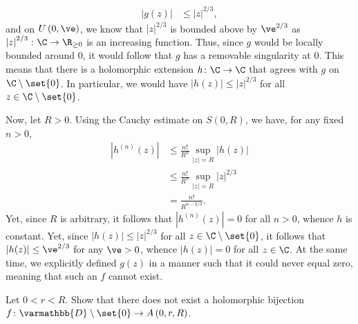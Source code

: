 \documentclass[10pt]{mypackage}
\renewcommand*{\mathbb}[1]{\varmathbb{#1}}
\begin{document}
\begin{solution}
\begin{enumerate}[(a)]
      \begin{align*}
        \left\vert g(z) \right\vert &\leq \left\vert z \right\vert^{2/3},
      \end{align*}
      and on $U\left( 0,\ve \right)$, we know that $\left\vert z \right\vert^{2/3}$ is bounded above by $\ve^{2/3}$ as $\left\vert z \right\vert^{2/3}\colon \C\rightarrow \R_{\geq 0}$ is an increasing function. Thus, since $g$ would be locally bounded around $0$, it would follow that $g$ has a removable singularity at $0$. This means that there is a holomorphic extension $h\colon \C\rightarrow \C$ that agrees with $g$ on $\C\setminus \set{0}$. In particular, we would have $\left\vert h(z) \right\vert \leq \left\vert z \right\vert^{2/3}$ for all $z\in \C\setminus\set{0}$.\newline

      Now, let $R > 0$. Using the Cauchy estimate on $S\left( 0,R \right)$, we have, for any fixed $n > 0$,
      \begin{align*}
        \left\vert h^{(n)}(z) \right\vert &\leq \frac{n!}{R^{n}} \sup_{\left\vert z \right\vert = R} \left\vert h(z) \right\vert\\
                                          &\leq \frac{n!}{R^{n}} \sup_{\left\vert z \right\vert = R} \left\vert z \right\vert^{2/3}\\
                                          &= \frac{n!}{R^{n-2/3}}.
      \end{align*}
      Yet, since $R$ is arbitrary, it follows that $\left\vert h^{(n)}(z) \right\vert = 0$ for all $n > 0$, whence $h$ is constant. Yet, since $\left\vert h(z) \right\vert \leq \left\vert z \right\vert^{2/3}$ for all $z \in \C\setminus \set{0}$, it follows that $\left\vert h(z) \right\vert \leq \ve^{2/3}$ for any $\ve > 0$, whence $\left\vert h(z) \right\vert = 0$ for all $z\in \C$. At the same time, we explicitly defined $g(z)$ in a manner such that it could never equal zero, meaning that such an $f$ cannot exist.
  \end{enumerate}
\end{solution}
\begin{problem}[Problem 3]
  Let $0 < r < R$. Show that there does not exist a holomorphic bijection $f\colon \mathbb{D}\setminus \set{0}\rightarrow A\left( 0,r,R \right)$.
\end{problem}
\end{document}
